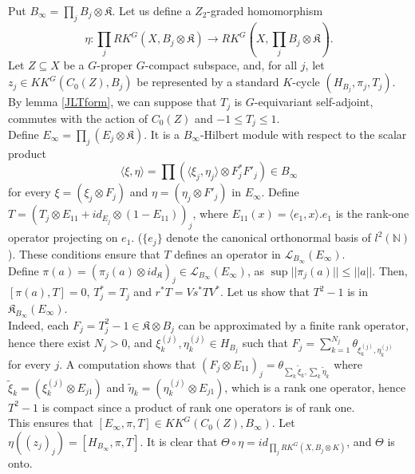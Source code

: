 \begin{dem}
Put $B_\infty = \prod_j B_j\otimes \mathfrak K $. Let us define a $Z_2$-graded homomorphism 
\[\eta :  \prod_j RK^G(X,B_j\otimes \mathfrak K) \rightarrow RK^G(X,\prod_j B_j\otimes \mathfrak K).\] 
Let $Z\subseteq X$ be a $G$-proper $G$-compact subspace, and, for all $j$, let $z_j\in KK^G(C_0(Z),B_j)$ be represented by a standard $K$-cycle $(H_{B_j},\pi_j ,T_j)$. By lemma \ref{JLTform}, we can suppose that $T_j$ is $G$-equivariant self-adjoint, commutes with the action of $C_0(Z)$ and $-1\leq T_j \leq 1$. \\

Define $E_\infty = \prod_j (E_j\otimes \mathfrak K)$. It is a $B_\infty$-Hilbert module with respect to the scalar product 
\[\langle \xi,\eta\rangle = \prod (\langle \xi_j,\eta_j\rangle \otimes F_j^* F'_j )\in B_\infty\] 
for every $\xi = (\xi_j\otimes F_j)$ and $\eta = (\eta_j\otimes F'_j)$ in $E_\infty$. Define $T = (T_j\otimes E_{11} + id_{E_j}\otimes (1-E_{11}))_j$, where $E_{11}(x)= \langle e_1,x\rangle. e_1$ is the rank-one operator projecting on $e_1$. ($\{e_j\}$ denote the canonical orthonormal basis of $l^2(\mathbb N)$).
These conditions ensure that $T $ defines an operator in $\mathcal L_{B_\infty}(E_\infty)$.\\

Define $\pi(a) = (\pi_j(a)\otimes id_{\mathfrak K})_j\in  \mathcal L_{B_\infty}(E_\infty)$, as $\sup ||\pi_j(a)||\leq ||a||$. Then, $[\pi(a),T]=0$, $T_j^*=T_j$ and $r^*T = Vs^*T V^*$. %
Let us show that $T^2-1$ is in $\mathfrak K_{B_\infty}(E_\infty)$.\\ 

Indeed, each $F_j = T_j^2-1\in \mathfrak K \otimes B_j$ can be approximated by a finite rank operator, hence there exist $N_j>0$, and $\xi_k^{(j)},\eta_k^{(j)}\in H_{B_j}$ such that $F_j= \sum_{k=1}^{N_j}\theta_{\xi_k^{(j)},\eta_k^{(j)}}$ for every $j$. A computation shows that $(F_j\otimes E_{11})_j = \theta_{\sum_k \tilde\xi_k,\sum_k \tilde \eta_k}$ where $\tilde \xi_k = (\xi_k^{(j)}\otimes E_{j1})$ and $\tilde \eta_k = (\eta_k^{(j)}\otimes E_{j1})$, which is a rank one operator, hence $T^2-1$ is compact since a product of rank one operators is of rank one.\\ 
This ensures that $[E_\infty,\pi,T]\in KK^G(C_0(Z),B_\infty)$. Let $\eta((z_j)_j) = [H_{B_\infty},\pi,T] $. It is clear that $\Theta\circ \eta = id_{\prod_j RK^G(X,B_j\otimes K) }$, and $\Theta $ is onto.\\


\end{dem}
